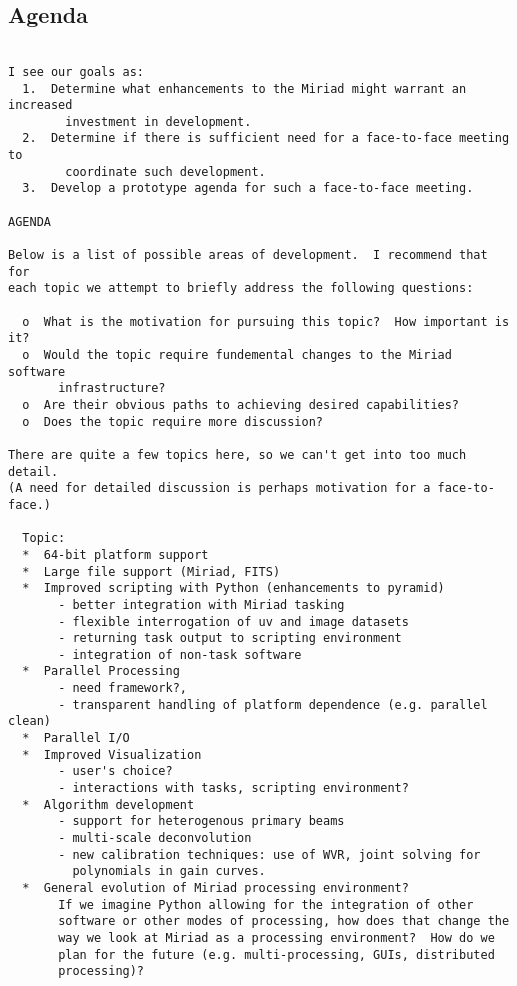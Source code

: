 \subsection{Agenda}

\begin{verbatim}

I see our goals as:
  1.  Determine what enhancements to the Miriad might warrant an increased
        investment in development.
  2.  Determine if there is sufficient need for a face-to-face meeting to 
        coordinate such development.
  3.  Develop a prototype agenda for such a face-to-face meeting.

AGENDA

Below is a list of possible areas of development.  I recommend that for 
each topic we attempt to briefly address the following questions:

  o  What is the motivation for pursuing this topic?  How important is it? 
  o  Would the topic require fundemental changes to the Miriad software 
       infrastructure?  
  o  Are their obvious paths to achieving desired capabilities?
  o  Does the topic require more discussion?

There are quite a few topics here, so we can't get into too much detail.  
(A need for detailed discussion is perhaps motivation for a face-to-face.)  

  Topic:
  *  64-bit platform support
  *  Large file support (Miriad, FITS)
  *  Improved scripting with Python (enhancements to pyramid)
       - better integration with Miriad tasking
       - flexible interrogation of uv and image datasets
       - returning task output to scripting environment
       - integration of non-task software
  *  Parallel Processing
       - need framework?, 
       - transparent handling of platform dependence (e.g. parallel clean)
  *  Parallel I/O
  *  Improved Visualization
       - user's choice?  
       - interactions with tasks, scripting environment?
  *  Algorithm development
       - support for heterogenous primary beams
       - multi-scale deconvolution
       - new calibration techniques: use of WVR, joint solving for
         polynomials in gain curves.
  *  General evolution of Miriad processing environment?
       If we imagine Python allowing for the integration of other
       software or other modes of processing, how does that change the
       way we look at Miriad as a processing environment?  How do we
       plan for the future (e.g. multi-processing, GUIs, distributed
       processing)?




\end{verbatim}

